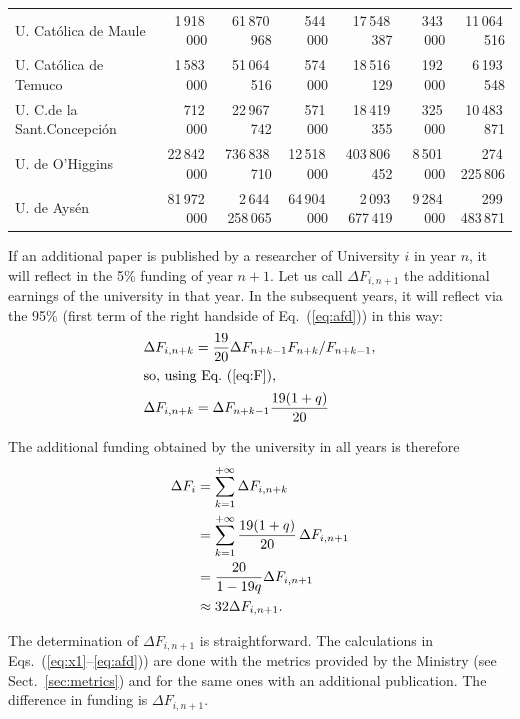 \documentclass[twocolumn]{article}
\def\eqref#1{Eq.~(\ref{eq:#1})}
\def\eqsref#1#2{Eqs.~(\ref{eq:#1}--\ref{eq:#2})}
\begin{document}
\begin{table}[t]
\begin{tabular}{l rr rr rr}
U. Católica de Maule           &   1\,918\,000 &    61\,870\,968 &     544\,000 &    17\,548\,387 &     343\,000 &    11\,064\,516 \\
U. Católica de Temuco          &   1\,583\,000 &    51\,064\,516 &     574\,000 &    18\,516\,129 &     192\,000 &     6\,193\,548 \\
U. C.de la Sant.Concepción     &     712\,000 &    22\,967\,742 &     571\,000 &    18\,419\,355 &     325\,000 &    10\,483\,871 \\
U. de O'Higgins                &  22\,842\,000 &   736\,838\,710 &  12\,518\,000 &   403\,806\,452 &   8\,501\,000 &   274\,225\,806 \\
U. de Aysén                    &  81\,972\,000 & 2\,644\,258\,065 &  64\,904\,000 & 2\,093\,677\,419 &   9\,284\,000 &   299\,483\,871 \\
\hline
\end{tabular}
\end{table}



If an additional paper is published by a researcher of University $i$ in year $n$, it will reflect in the 5\% funding of year $n + 1$. Let us call $\Delta F_{i,n+1}$ the additional earnings 
of the university in that year.  In the subsequent years, it will reflect via the 95\% 
(first term of the right handside of \eqref{afd}) in this way:
\begin{align}
   \Delta F_{i,n+k} &=  \frac{19}{20} \Delta F_{n+k-1} F_{n+k}  / F_{n+k-1}, \notag\\
\intertext{so, using \eqref{F},}
   \Delta F_{i,n+k} &= \Delta F_{n+k-1}  \frac{ 19 (1 + q)} { 20}
\end{align}

The additional funding obtained by the university in all years is therefore
\begin{align}
    \Delta F_{i} &= \sum_{k=1}^{+\infty} \Delta F_{i,n+k} \notag \\
                 &= \sum_{k=1}^{+\infty} \frac{19(1 + q)}{20} \,\Delta F_{i,n+1} \notag \\
                 &= \frac{20} { 1 - 19q } \Delta F_{i,n+1}\\
                 &\approx 32 \Delta F_{i,n+1}. \notag
\end{align}

The determination of $\Delta F_{i,n+1}$ is straightforward.  The calculations
in \eqsref{x1}{afd}) are done with the metrics provided by the Ministry (see Sect.~\ref{sec:metrics}) and for the same ones with an additional publication.  The difference in funding is $\Delta F_{i,n+1}$. 
\end{document}

